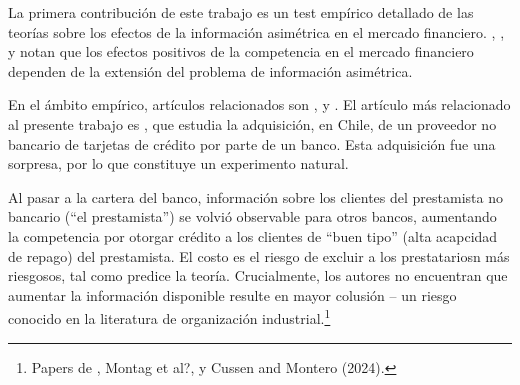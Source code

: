 \documentclass[11pt]{article}
\theoremstyle{plain}
\theoremstyle{plain}
\begin{document}
 



\vspace{2cm} 


La primera contribución de este trabajo es un test empírico detallado de las teorías sobre los efectos de la información asimétrica en el mercado financiero. \textcite{sharpe_asymmetric_1990}, \textcite{petersen_effect_1995}, \textcite{dellariccia_adverse_1999} y \textcite{dellariccia_information_2004} notan que los efectos positivos de la competencia en el mercado financiero dependen de la extensión del problema de información asimétrica.

En el ámbito empírico, artículos relacionados son \textcite{petersen_benefits_1994,petersen_effect_1995}, \textcite{liberman_equilibrium_2018} y \textcite{foley_effects_2022}. El artículo más relacionado al presente trabajo es \textcite{foley_effects_2022}, que estudia la adquisición, en Chile, de un proveedor no bancario de tarjetas de crédito por parte de un banco. Esta adquisición fue una sorpresa, por lo que constituye un experimento natural. 

Al pasar a la cartera del banco, información sobre los clientes del prestamista no bancario (``el prestamista'') se volvió observable para otros bancos, aumentando la competencia por otorgar crédito a los clientes de ``buen tipo'' (alta acapcidad de repago) del prestamista. El costo es el riesgo de excluir a los prestatariosn más riesgosos, tal como predice la teoría. Crucialmente, los autores no encuentran que aumentar la información disponible resulte en mayor colusión -- un riesgo conocido en la literatura de organización industrial.\footnote{Papers de \textcite{green_noncooperative_1984}, Montag et al?, y Cussen and Montero (2024).}
\end{document}
